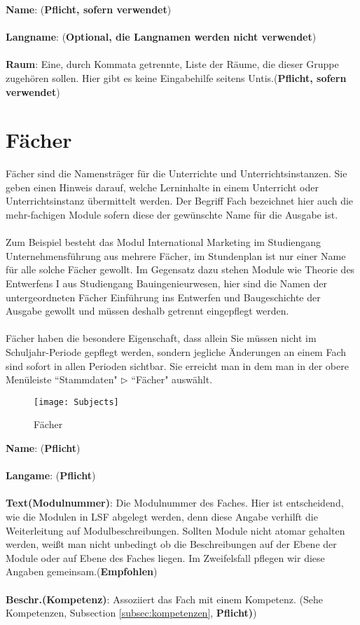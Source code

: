 \documentclass[]{report}
\begin{document}
\noindent
\textbf{Name}: (\textbf{Pflicht, sofern verwendet})\\
\\
\textbf{Langname}: (\textbf{Optional, die Langnamen werden nicht verwendet})\\
\\
\textbf{Raum}: Eine, durch Kommata getrennte, Liste der Räume, die dieser Gruppe zugehören sollen. Hier gibt es keine Eingabehilfe seitens Untis.(\textbf{Pflicht, sofern verwendet})\\

\newpage
\section{Fächer}

Fächer sind die Namensträger für die Unterrichte und Unterrichtsinstanzen. Sie geben einen Hinweis darauf, welche Lerninhalte in einem Unterricht oder Unterrichtsinstanz übermittelt werden. Der Begriff Fach bezeichnet hier auch die mehr-fachigen Module sofern diese der gewünschte Name für die Ausgabe ist.\\
\\
Zum Beispiel besteht das Modul International Marketing im Studiengang Unternehmensführung aus mehrere Fächer, im Stundenplan ist nur einer Name für alle solche Fächer gewollt. Im Gegensatz dazu stehen Module wie Theorie des Entwerfens I aus Studiengang Bauingenieurwesen, hier sind die Namen der untergeordneten Fächer Einführung ins Entwerfen und Baugeschichte der Ausgabe gewollt und müssen deshalb getrennt eingepflegt werden.\\
\\ 
Fächer haben die besondere Eigenschaft, dass allein Sie müssen nicht im Schuljahr-Periode gepflegt werden, sondern jegliche Änderungen an einem Fach sind sofort in allen Perioden sichtbar. Sie erreicht man in dem man in der obere Menüleiste ``Stammdaten" $\triangleright$ ``Fächer" auswählt.

\begin{figure}[h]
	\texttt{[image: Subjects]}
	\vspace{-15pt}
	\caption{Fächer}
	\label{fig:subjects}
\end{figure}

\noindent
\textbf{Name}: (\textbf{Pflicht})\\
\\
\textbf{Langame}: (\textbf{Pflicht})\\
\\
\textbf{Text(Modulnummer)}: Die Modulnummer des Faches. Hier ist entscheidend, wie die Modulen in LSF abgelegt werden, denn diese Angabe verhilft die Weiterleitung auf Modulbeschreibungen. Sollten Module nicht atomar gehalten werden, weißt man nicht unbedingt ob die Beschreibungen auf der Ebene der Module oder auf Ebene des Faches liegen. Im Zweifelsfall pflegen wir diese Angaben gemeinsam.(\textbf{Empfohlen})\\
\\
\textbf{Beschr.(Kompetenz)}: Assoziiert das Fach mit einem Kompetenz. (Sehe Kompetenzen, Subsection  \ref{subsec:kompetenzen}, \textbf{Pflicht)})
\end{document}
